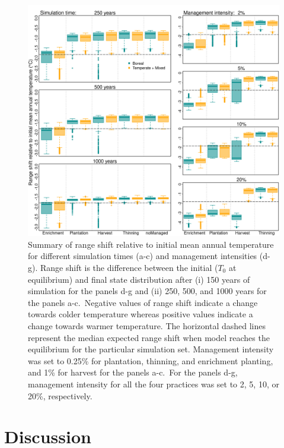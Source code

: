 \documentclass[12pt]{article}
\begin{document}
\begin{figure}
\hypertarget{fig:sim-result3}{%
\centering
\includegraphics{manuscript/img/sim-result_4.png}
\caption{Summary of range shift relative to initial mean annual
temperature for different simulation times (a-c) and management
intensities (d-g). Range shift is the difference between the initial
(\(T_0\) at equilibrium) and final state distribution after (i) 150
years of simulation for the panels d-g and (ii) 250, 500, and 1000 years
for the panels a-c.~Negative values of range shift indicate a change
towards colder temperature whereas positive values indicate a change
towards warmer temperature. The horizontal dashed lines represent the
median expected range shift when model reaches the equilibrium for the
particular simulation set. Management intensity was set to 0.25\% for
plantation, thinning, and enrichment planting, and 1\% for harvest for
the panels a-c.~For the panels d-g, management intensity for all the
four practices was set to 2, 5, 10, or 20\%,
respectively.}\label{fig:sim-result3}
}
\end{figure}

\hypertarget{discussion}{%
\section{Discussion}\label{discussion}}
\end{document}
